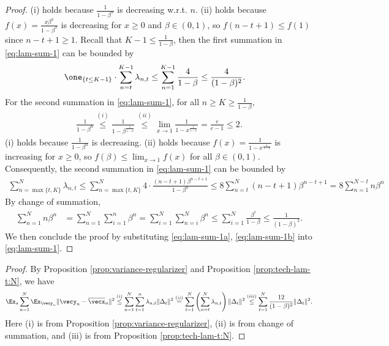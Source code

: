\begin{proof}
(i) holds because $\frac{1}{1-\beta^n}$ is decreasing w.r.t. $n$. (ii) holds because $f(x)=\frac{x\beta^x}{1-\beta^x}$ is decreasing for $x\ge 0$ and $\beta\in(0,1)$, so $f(n-t+1) \le f(1)$ since $n-t+1 \ge 1$.
Recall that $K-1\le \frac{1}{1-\beta}$, then the first summation in \eqref{eq:lam-sum-1} can be bounded by
\begin{align}
    \one_{\{t\le K-1\}}\cdot \sum_{n=t}^{K-1} \lambda_{n,t}
    &\le \sum_{n=1}^{K-1} \frac{4}{1-\beta} \le \frac{4}{(1-\beta)^2}.
    \label{eq:lam-sum-1a}
\end{align}
For the second summation in \eqref{eq:lam-sum-1}, for all $n\ge K \ge \frac{1}{1-\beta}$, 
\begin{align*}
    \frac{1}{1-\beta^n} 
    \stackrel{(i)}{\le} \frac{1}{1-\beta^{\frac{1}{1-\beta}}} 
    \stackrel{(ii)}{\le} \lim_{x\to 1} \frac{1}{1-x^{\frac{1}{1-x}}} = \frac{e}{e-1} \le 2.
\end{align*}
(i) holds because $\frac{1}{1-\beta^n}$ is decreasing. (ii) holds because $f(x)=\frac{1}{1-x^{\frac{1}{1-x}}}$ is increasing for $x\ge 0$, so $f(\beta) \le \lim_{x\to 1}f(x)$ for all $\beta\in(0,1)$. Consequently, the second summation in \eqref{eq:lam-sum-1} can be bounded by
\begin{align}
    \sum_{n=\max\{t,K\}}^N \lambda_{n,t}
    \le \sum_{n=\max\{t,K\}}^N 4\cdot \frac{(n-t+1)\beta^{n-t+1}}{1-\beta^n} 
    \le 8\sum_{n=t}^N (n-t+1)\beta^{n-t+1} 
    = 8\sum_{n=1}^{N-t} n\beta^n
    \label{eq:lam-sum-1b}
\end{align}
By change of summation,
\begin{align*}
    \sum_{n=1}^N n\beta^n
    &= \sum_{n=1}^N \sum_{i=1}^n \beta^n 
    = \sum_{i=1}^N \sum_{n=i}^N \beta^n
    \le \sum_{i=1}^N \frac{\beta^i}{1-\beta}
    \le \frac{1}{(1-\beta)^2}.
\end{align*}
We then conclude the proof by substituting \eqref{eq:lam-sum-1a}, \eqref{eq:lam-sum-1b} into \eqref{eq:lam-sum-1}.
\end{proof}

\VarianceToRegularizer*

\begin{proof}
By Proposition \ref{prop:variance-regularizer} and Proposition \ref{prop:tech-lam-t:N}, we have
\begin{align*}
    \Ex_s\sum_{n=1}^N\Ex_{\vecy_n} \|\vecy_n-\overline\vecx_n\|^2 
    \stackrel{(i)}{\le} \sum_{n=1}^N\sum_{t=1}^n \lambda_{n,t}\|\Delta_t\|^2 
    \stackrel{(ii)}{=} \sum_{t=1}^N\left(\sum_{n=t}^N \lambda_{n,t}\right) \|\Delta_t\|^2 
    \stackrel{(iii)}{\le} \sum_{t=1}^N \frac{12}{(1-\beta)^2} \|\Delta_t\|^2. 
\end{align*}
Here (i) is from Proposition \ref{prop:variance-regularizer}, (ii) is from change of summation, and (iii) is from Proposition \ref{prop:tech-lam-t:N}.
\end{proof}



